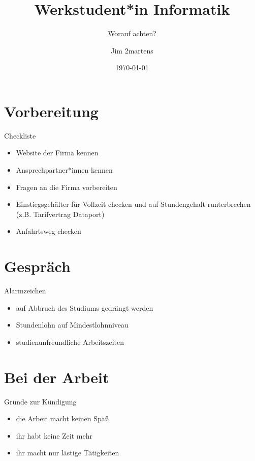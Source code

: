 \documentclass{beamer}
\begin{document}
\author{Jim 2martens}
\title{Werkstudent*in Informatik}
\subtitle{Worauf achten?}
\date{\today}


\begin{frame}
    \titlepage
\end{frame}

\begin{frame}
    \tableofcontents
\end{frame}

\section{Vorbereitung}
\begin{frame}{Checkliste}
    \begin{itemize}
      \item Website der Firma kennen
      \vfill
      \item Ansprechpartner*innen kennen
      \vfill
      \item Fragen an die Firma vorbereiten
      \vfill
      \item Einstiegsgehälter für Vollzeit checken und auf Stundengehalt runterbrechen (z.B. Tarifvertrag Dataport)
      \vfill
      \item Anfahrtsweg checken
    \end{itemize}
\end{frame}

\section{Gespräch}
\begin{frame}{Alarmzeichen}
  \begin{itemize}
    \item auf Abbruch des Studiums gedrängt werden
    \vfill
    \item Stundenlohn auf Mindestlohnniveau
    \vfill
    \item studienunfreundliche Arbeitszeiten
  \end{itemize}
\end{frame}

\section{Bei der Arbeit}
\begin{frame}{Gründe zur Kündigung}
  \begin{itemize}
    \item die Arbeit macht keinen Spaß
    \vfill
    \item ihr habt keine Zeit mehr
    \vfill
    \item ihr macht nur lästige Tätigkeiten
  \end{itemize}
\end{frame}
\end{document}
